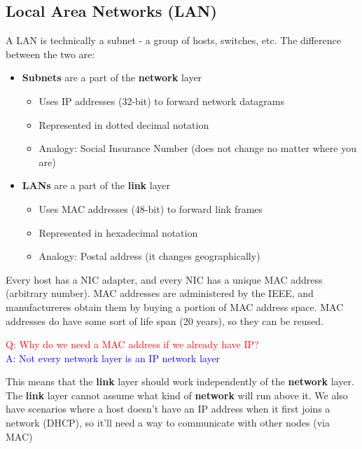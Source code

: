 \documentclass{article}
\begin{document}
\newpage

\subsection{Local Area Networks (LAN)}
A LAN is technically a subnet - a group of hosts, switches, etc. The difference between the two are:
\begin{itemize}
    \item \textbf{Subnets} are a part of the \textbf{network} layer
    \begin{itemize}
        \item Uses IP addresses (32-bit) to forward network datagrams
        \item Represented in dotted decimal notation
        \item Analogy: Social Insurance Number (does not change no matter where you are)
    \end{itemize}
    \item \textbf{LANs} are a part of the \textbf{link} layer
    \begin{itemize}
        \item Uses MAC addresses (48-bit) to forward link frames
        \item Represented in hexadecimal notation
        \item Analogy: Postal address (it changes geographically)
    \end{itemize}
\end{itemize}
Every host has a NIC adapter, and every NIC has a unique MAC address (arbitrary number). MAC addresses
are administered by the IEEE, and manufactureres obtain them by buying a portion of MAC address space.
MAC addresses do have some sort of life span (20 years), so they can be reused.
\begin{center}
    \textcolor{red}{Q: Why do we need a MAC address if we already have IP?} \\
    \textcolor{blue}{A: Not every network layer is an IP network layer}
\end{center}
This means that the \textbf{link} layer should work independently of the \textbf{network} layer.
The \textbf{link} layer cannot assume what kind of \textbf{network} will run above it. We also have
scenarios where a host doesn't have an IP address when it first joins a network (DHCP), so it'll need a way
to communicate with other nodes (via MAC)

\end{document}
